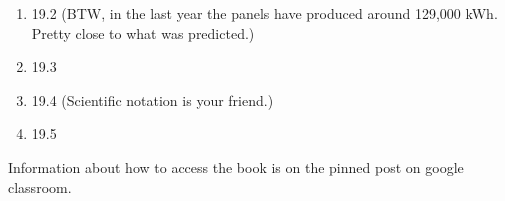 \documentclass[12pt]{article}
\begin{document}
\begin{enumerate}
  \setlength{\itemsep}{-1mm}
\item 19.2 (BTW, in the last year the panels have produced around 129,000 kWh. Pretty
  close to what was predicted.)
\item  19.3
\item 19.4 (Scientific notation is your friend.)
\item 19.5
\end{enumerate}



\noindent Information about how to access the book is on the
pinned post on google classroom. 
\end{document}

